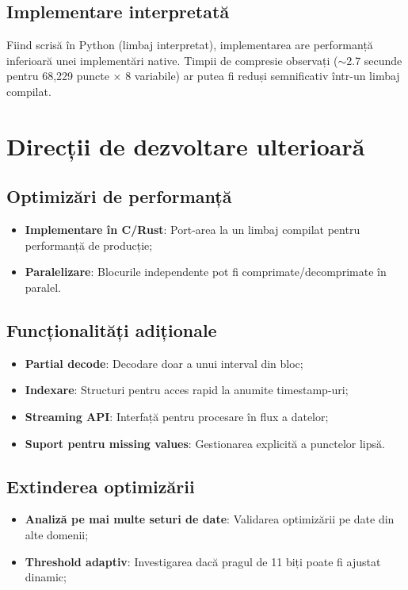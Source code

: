 \subsection{Implementare interpretată}

Fiind scrisă în Python (limbaj interpretat), implementarea are performanță inferioară unei implementări native. Timpii de compresie observați ($\sim$2.7 secunde pentru 68,229 puncte × 8 variabile) ar putea fi reduși semnificativ într-un limbaj compilat.

\section{Direcții de dezvoltare ulterioară}

\subsection{Optimizări de performanță}

\begin{itemize}
    \item \textbf{Implementare în C/Rust}: Port-area la un limbaj compilat pentru performanță de producție;
    \item \textbf{Paralelizare}: Blocurile independente pot fi comprimate/decomprimate în paralel.
\end{itemize}

\subsection{Funcționalități adiționale}

\begin{itemize}
    \item \textbf{Partial decode}: Decodare doar a unui interval din bloc;
    \item \textbf{Indexare}: Structuri pentru acces rapid la anumite timestamp-uri;
    \item \textbf{Streaming API}: Interfață pentru procesare în flux a datelor;
    \item \textbf{Suport pentru missing values}: Gestionarea explicită a punctelor lipsă.
\end{itemize}

\subsection{Extinderea optimizării}

\begin{itemize}
    \item \textbf{Analiză pe mai multe seturi de date}: Validarea optimizării pe date din alte domenii;
    \item \textbf{Threshold adaptiv}: Investigarea dacă pragul de 11 biți poate fi ajustat dinamic;
\end{itemize}

